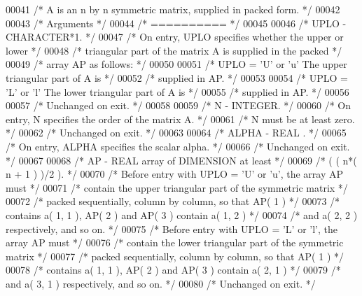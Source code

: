 \begin{DoxyCode}
00041 \textcolor{comment}{/*  A is an n by n symmetric matrix, supplied in packed form. */}
00042 
00043 \textcolor{comment}{/*  Arguments */}
00044 \textcolor{comment}{/*  ========== */}
00045 
00046 \textcolor{comment}{/*  UPLO   - CHARACTER*1. */}
00047 \textcolor{comment}{/*           On entry, UPLO specifies whether the upper or lower */}
00048 \textcolor{comment}{/*           triangular part of the matrix A is supplied in the packed */}
00049 \textcolor{comment}{/*           array AP as follows: */}
00050 
00051 \textcolor{comment}{/*              UPLO = 'U' or 'u'   The upper triangular part of A is */}
00052 \textcolor{comment}{/*                                  supplied in AP. */}
00053 
00054 \textcolor{comment}{/*              UPLO = 'L' or 'l'   The lower triangular part of A is */}
00055 \textcolor{comment}{/*                                  supplied in AP. */}
00056 
00057 \textcolor{comment}{/*           Unchanged on exit. */}
00058 
00059 \textcolor{comment}{/*  N      - INTEGER. */}
00060 \textcolor{comment}{/*           On entry, N specifies the order of the matrix A. */}
00061 \textcolor{comment}{/*           N must be at least zero. */}
00062 \textcolor{comment}{/*           Unchanged on exit. */}
00063 
00064 \textcolor{comment}{/*  ALPHA  - REAL            . */}
00065 \textcolor{comment}{/*           On entry, ALPHA specifies the scalar alpha. */}
00066 \textcolor{comment}{/*           Unchanged on exit. */}
00067 
00068 \textcolor{comment}{/*  AP     - REAL             array of DIMENSION at least */}
00069 \textcolor{comment}{/*           ( ( n*( n + 1 ) )/2 ). */}
00070 \textcolor{comment}{/*           Before entry with UPLO = 'U' or 'u', the array AP must */}
00071 \textcolor{comment}{/*           contain the upper triangular part of the symmetric matrix */}
00072 \textcolor{comment}{/*           packed sequentially, column by column, so that AP( 1 ) */}
00073 \textcolor{comment}{/*           contains a( 1, 1 ), AP( 2 ) and AP( 3 ) contain a( 1, 2 ) */}
00074 \textcolor{comment}{/*           and a( 2, 2 ) respectively, and so on. */}
00075 \textcolor{comment}{/*           Before entry with UPLO = 'L' or 'l', the array AP must */}
00076 \textcolor{comment}{/*           contain the lower triangular part of the symmetric matrix */}
00077 \textcolor{comment}{/*           packed sequentially, column by column, so that AP( 1 ) */}
00078 \textcolor{comment}{/*           contains a( 1, 1 ), AP( 2 ) and AP( 3 ) contain a( 2, 1 ) */}
00079 \textcolor{comment}{/*           and a( 3, 1 ) respectively, and so on. */}
00080 \textcolor{comment}{/*           Unchanged on exit. */}

\end{DoxyCode}
